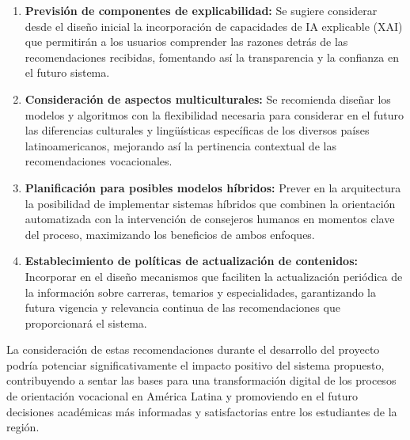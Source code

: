 \begin{enumerate}
\item \textbf{Previsión de componentes de explicabilidad:} Se sugiere considerar desde el diseño inicial la incorporación de capacidades de IA explicable (XAI) que permitirán a los usuarios comprender las razones detrás de las recomendaciones recibidas, fomentando así la transparencia y la confianza en el futuro sistema.
\item \textbf{Consideración de aspectos multiculturales:} Se recomienda diseñar los modelos y algoritmos con la flexibilidad necesaria para considerar en el futuro las diferencias culturales y lingüísticas específicas de los diversos países latinoamericanos, mejorando así la pertinencia contextual de las recomendaciones vocacionales.
\item \textbf{Planificación para posibles modelos híbridos:} Prever en la arquitectura la posibilidad de implementar sistemas híbridos que combinen la orientación automatizada con la intervención de consejeros humanos en momentos clave del proceso, maximizando los beneficios de ambos enfoques.
\item \textbf{Establecimiento de políticas de actualización de contenidos:} Incorporar en el diseño mecanismos que faciliten la actualización periódica de la información sobre carreras, temarios y especialidades, garantizando la futura vigencia y relevancia continua de las recomendaciones que proporcionará el sistema.
\end{enumerate}
La consideración de estas recomendaciones durante el desarrollo del proyecto podría potenciar significativamente el impacto positivo del sistema propuesto, contribuyendo a sentar las bases para una transformación digital de los procesos de orientación vocacional en América Latina y promoviendo en el futuro decisiones académicas más informadas y satisfactorias entre los estudiantes de la región.